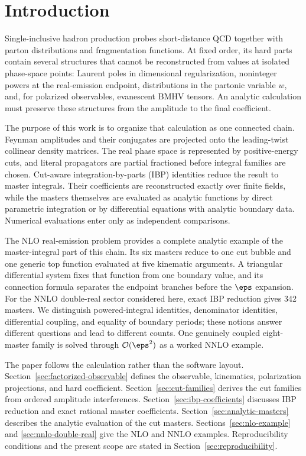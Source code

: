 \section{Introduction}
\label{sec:introduction}

Single-inclusive hadron production probes short-distance QCD together with
parton distributions and fragmentation functions.  At fixed order, its hard
parts contain several structures that cannot be reconstructed from values at
isolated phase-space points: Laurent poles in dimensional regularization,
noninteger powers at the real-emission endpoint, distributions in the
partonic variable $w$, and, for polarized observables, evanescent BMHV
tensors.  An analytic calculation must preserve these structures from the
amplitude to the final coefficient.

The purpose of this work is to organize that calculation as one connected
chain.  Feynman amplitudes and their conjugates are projected onto the
leading-twist collinear density matrices.  The real phase space is represented
by positive-energy cuts, and literal propagators are partial fractioned before
integral families are chosen.  Cut-aware integration-by-parts (IBP) identities
reduce the result to master integrals.  Their coefficients are reconstructed
exactly over finite fields, while the masters themselves are evaluated as
analytic functions by direct parametric integration or by differential
equations with analytic boundary data.  Numerical evaluations enter only as
independent comparisons.

The NLO real-emission problem provides a complete analytic example of the
master-integral part of this chain.  Its six masters reduce to one cut bubble
and one generic top function evaluated at five kinematic arguments.  A
triangular differential system fixes that function from one boundary value,
and its connection formula separates the endpoint branches before the
$\eps$ expansion.  For the NNLO double-real sector considered here, exact
IBP reduction gives 342 masters.  We distinguish powered-integral identities,
denominator identities, differential coupling, and equality of boundary
periods; these notions answer different questions and lead to different
counts.  One genuinely coupled eight-master family is solved through
$\mathcal O(\eps^2)$ as a worked NNLO example.

The paper follows the calculation rather than the software layout.
Section~\ref{sec:factorized-observable} defines the observable, kinematics,
polarization projections, and hard coefficient.
Section~\ref{sec:cut-families} derives the cut families from ordered amplitude
interferences.  Section~\ref{sec:ibp-coefficients} discusses IBP reduction and
exact rational master coefficients.  Section~\ref{sec:analytic-masters}
describes the analytic evaluation of the cut masters.
Sections~\ref{sec:nlo-example} and \ref{sec:nnlo-double-real} give the NLO and
NNLO examples.  Reproducibility conditions and the present scope are stated in
Section~\ref{sec:reproducibility}.

